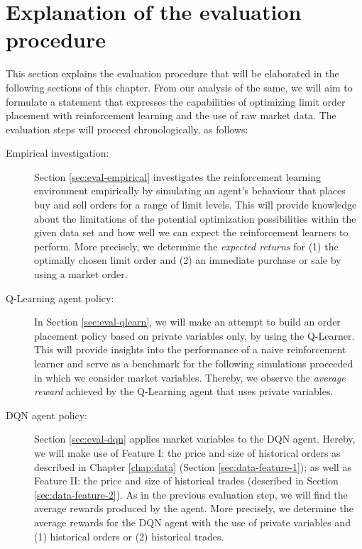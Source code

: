\section{Explanation of the evaluation procedure}
\label{sec:analysis-procedure}
This section explains the evaluation procedure that will be elaborated in the following sections of this chapter. From our analysis of the same, we will aim to formulate a statement that expresses the capabilities of optimizing limit order placement with reinforcement learning and the use of raw market data.
The evaluation steps will proceed chronologically, as follows:
\begin{description}
    \item[Empirical investigation: ]
    Section \ref{sec:eval-empirical} investigates the reinforcement learning environment empirically by simulating an agent's behaviour that places buy and sell orders for a range of limit levels.
    This will provide knowledge about the limitations of the potential optimization possibilities within the given data set and how well we can expect the reinforcement learners to perform.
    More precisely, we determine the \textit{expected returns} for (1) the optimally chosen limit order and (2) an immediate purchase or sale by using a market order.
    
    \item[Q-Learning agent policy: ]
    In Section \ref{sec:eval-qlearn}, we will make an attempt to build an order placement policy based on private variables only, by using the Q-Learner.
    This will provide insights into the performance of a naive reinforcement learner and serve as a benchmark for the following simulations proceeded in which we consider market variables.
    Thereby, we observe the \textit{average reward} achieved by the Q-Learning agent that uses private variables.

    \item[DQN agent policy: ]
    Section \ref{sec:eval-dqn} applies market variables to the DQN agent.
    Hereby, we will make use of Feature I: the price and size of historical orders as described in Chapter \ref{chap:data} (Section \ref{sec:data-feature-1}); as well as Feature II: the price and size of historical trades (described in Section \ref{sec:data-feature-2}).
    As in the previous evaluation step, we will find the average rewards produced by the agent.
    More precisely, we determine the average rewards for the DQN agent with the use of private variables and (1) historical orders or (2) historical trades.


\end{description}
